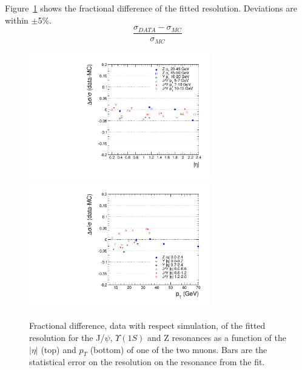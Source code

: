 Figure~\ref{fig:ResolDATAMC_8TeV} shows the fractional difference of the fitted resolution.
Deviations are within $\pm$5\%.
\[
\frac{\sigma_{DATA}-\sigma_{MC}}{\sigma_{MC}}
\]
\begin{figure}[hbtp]  
\begin{center}
\includegraphics[width=0.7\textwidth]{figures/H4l_Style/2012_22Jan2013ReReco/ResolEta_afterCorrection_V2}
\includegraphics[width=0.7\textwidth]{figures/H4l_Style/2012_22Jan2013ReReco/ResolPt_afterCorrection_V2} 
 \hspace{1cm} 
   \caption{Fractional difference, data with respect simulation, of the fitted resolution for the J/$\psi$,
     $\Upsilon(1S)$ and Z resonances as a function of the $|\eta|$ (top)
     and $p_T$ (bottom) of one of the two muons. Bars are the
     statistical error on the resolution on the resonance from the fit.
   \label{fig:ResolDATAMC_8TeV}}
 \end{center}
\end{figure} 



